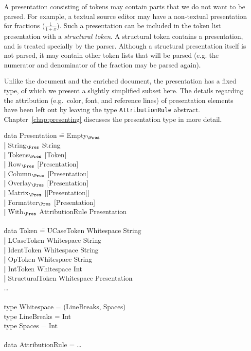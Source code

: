 A presentation consisting of tokens may contain parts that we do not want to be parsed. For example, a textual source editor may have a non-textual presentation for fractions ($\frac{1}{1+x}$). Such a presentation can be included in the token list presentation with a {\em structural token}. A structural token contains a presentation, and is treated specially by the parser. Although a structural presentation itself is not parsed, it may contain other token lists that will be parsed (e.g. the numerator and denominator of the fraction may be parsed again).

Unlike the document and the enriched document, the presentation has a fixed type, of which we present a slightly simplified subset here. The details regarding the attribution (e.g.\ color, font, and reference lines) of presentation elements have been left out by leaving the type \verb|AttributionRule| abstract. Chapter~\ref{chap:presenting} discusses the presentation type in more detail.

\noindent
\ttfamily
\begin{tabbing}
data Presentation \= = Empty$_{\Pres}$\\
                  \> | String$_{\Pres}$ String \\
                  \> | Tokens$_{\Pres}$ [Token]\\
                  \> | Row$_{\Pres}$ [Presentation]\\
                  \> | Column$_{\Pres}$ [Presentation]\\
                  \> | Overlay$_{\Pres}$ [Presentation]\\
                  \> | Matrix$_{\Pres}$ [[Presentation]]\\
                  \> | Formatter$_{\Pres}$ [Presentation]\\
                  \> | With$_{\Pres}$ AttributionRule Presentation\\
\\
data Token \= = UCaseToken Whitespace String\\
           \> | LCaseToken Whitespace String\\
           \> | IdentToken Whitespace String\\
           \> | OpToken Whitespace String\\
           \> | IntToken Whitespace Int\\
           \> | StructuralToken Whitespace Presentation\\
           \> \dots \\
\\
type Whitespace = (LineBreaks, Spaces)\\
type LineBreaks = Int\\
type Spaces = Int\\
\\
data AttributionRule = \dots\\
\end{tabbing}
\rmfamily


